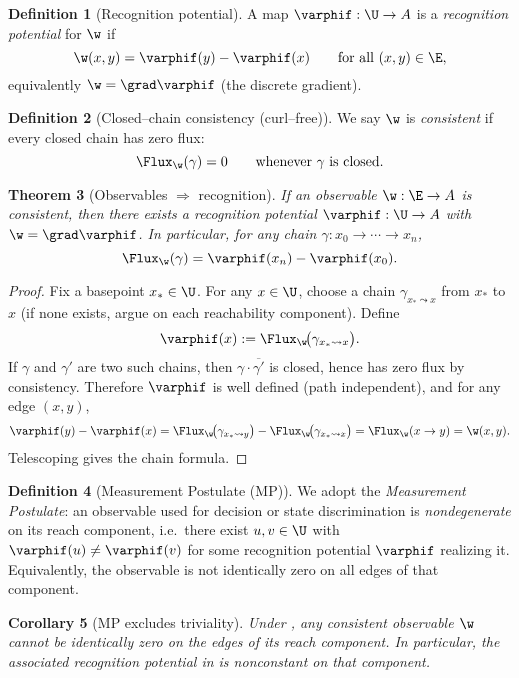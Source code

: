 \documentclass[12pt,a4paper]{article}
\newtheorem{theorem}{Theorem}[section]
\newtheorem{corollary}[theorem]{Corollary}
\theoremstyle{definition}
\newtheorem{definition}[theorem]{Definition}
\theoremstyle{remark}
\begin{document}
\begin{definition}[Recognition potential]
A map $\varphif:\U\to A$ is a \emph{recognition potential} for $\w$ if
\[
  \w(x,y)=\varphif(y)-\varphif(x)\qquad\text{for all }(x,y)\in \E,
\]
equivalently $\w=\grad\varphif$ (the discrete gradient).
\end{definition}

\begin{definition}[Closed--chain consistency (curl--free)]
We say $\w$ is \emph{consistent} if every closed chain has zero flux:
\[
  \Flux_{\w}(\gamma)=0\qquad\text{whenever } \gamma \text{ is closed}.
\]
\end{definition}

\begin{theorem}[Observables $\Rightarrow$ recognition]
\label{thm:necessity}
If an observable $\w:\E\to A$ is consistent, then there exists a recognition potential $\varphif:\U\to A$ with $\w=\grad\varphif$. In particular, for any chain $\gamma:x_0\to\cdots\to x_n$,
\[
  \Flux_{\w}(\gamma)=\varphif(x_n)-\varphif(x_0).
\]
\end{theorem}

\begin{proof}
Fix a basepoint $x_\ast\in\U$. For any $x\in\U$, choose a chain $\gamma_{x_\ast\leadsto x}$ from $x_\ast$ to $x$ (if none exists, argue on each reachability component). Define
\[
  \varphif(x):=\Flux_{\w}\!\big(\gamma_{x_\ast\leadsto x}\big).
\]
If $\gamma$ and $\gamma'$ are two such chains, then $\gamma\cdot \overline{\gamma'}$ is closed, hence has zero flux by consistency. Therefore $\varphif$ is well defined (path independent), and for any edge $(x,y)$,
\[
  \varphif(y)-\varphif(x)=\Flux_{\w}\!\big(\gamma_{x_\ast\leadsto y}\big)-\Flux_{\w}\!\big(\gamma_{x_\ast\leadsto x}\big)
  =\Flux_{\w}(x\to y)=\w(x,y).
\]
Telescoping gives the chain formula.
\end{proof}

\begin{definition}[Measurement Postulate (MP)]
\label{def:MP}
We adopt the \emph{Measurement Postulate}: an observable used for decision or state discrimination is \emph{nondegenerate} on its reach component, i.e.\ there exist $u,v\in\U$ with $\varphif(u)\neq \varphif(v)$ for some recognition potential $\varphif$ realizing it. Equivalently, the observable is not identically zero on all edges of that component.
\end{definition}

\begin{corollary}[MP excludes triviality]
\label{cor:MP-nontrivial}
Under , any consistent observable $\w$ cannot be identically zero on the edges of its reach component. In particular, the associated recognition potential in  is nonconstant on that component.
\end{corollary}
\end{document}
